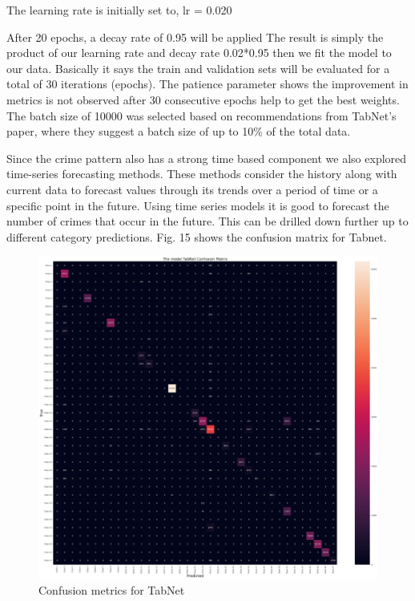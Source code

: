 \documentclass[11 pt,conference,final,]{IEEEtran}
\begin{document}
The learning rate is initially set to, lr = 0.020

After 20 epochs, a decay rate of 0.95 will be applied The result is
simply the product of our learning rate and decay rate 0.02*0.95 then we
fit the model to our data. Basically it says the train and validation
sets will be evaluated for a total of 30 iterations (epochs). The
patience parameter shows the improvement in metrics is not observed
after 30 consecutive epochs help to get the best weights. The batch size
of 10000 was selected based on recommendations from TabNet's paper,
where they suggest a batch size of up to 10\% of the total data.

Since the crime pattern also has a strong time based component we also
explored time-series forecasting methods. These methods consider the
history along with current data to forecast values through its trends
over a period of time or a specific point in the future. Using time
series models it is good to forecast the number of crimes that occur in
the future. This can be drilled down further up to different category
predictions. Fig. 15 shows the confusion matrix for Tabnet.

\begin{figure}

{\centering \includegraphics[width=0.9\linewidth]{img/TabNet} 

}

\caption{Confusion metrics for TabNet}\label{fig:unnamed-chunk-15}
\end{figure}
\end{document}
